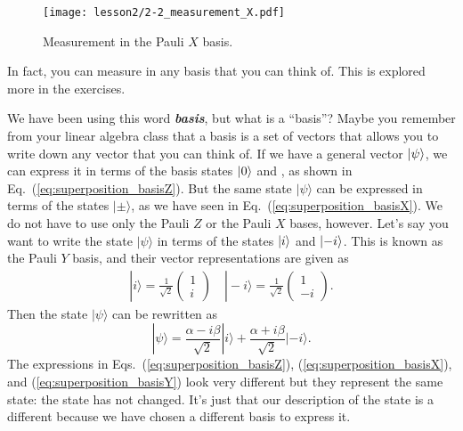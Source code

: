 \begin{figure}[H]
    \centering
    \texttt{[image: lesson2/2-2\_measurement\_X.pdf]}
    \caption{Measurement in the Pauli $X$ basis.}
    \label{fig:x-meas}
\end{figure}

In fact, you can measure in any basis that you can think of.  This is explored more in the exercises.

We have been using this word \textbf{\emph{basis}}, but what is a ``basis''? Maybe you remember from your linear algebra class that a basis is a set of vectors that allows you to write down any vector that you can think of. If we have a general vector $\left| \psi \right\rangle$, we can express it in terms of the basis states $\left| 0 \right\rangle$ and , as shown in Eq.~(\ref{eq:superposition_basisZ}).
But the same state $|\psi\rangle$ can be expressed in terms of the states $|\pm\rangle$, as we have seen in Eq.~(\ref{eq:superposition_basisX}).
We do not have to use only the Pauli $Z$ or the Pauli $X$ bases, however.
Let's say you want to write the state $|\psi\rangle$ in terms of the states $\left| i \right\rangle$ and $\left| -i \right\rangle$.
This is known as the Pauli $Y$ basis, and their vector representations are given as
\begin{align}
    |i\rangle=\frac{1}{\sqrt{2}}\left(\begin{array}{l}1 \\ i\end{array}\right) \quad|-i\rangle=\frac{1}{\sqrt{2}}\left(\begin{array}{c}1 \\ -i\end{array}\right).
    \label{eq:Pauli_Y_basis}
\end{align}
Then the state $|\psi\rangle$ can be rewritten as
\begin{equation}
    |\psi\rangle=\frac{\alpha-i \beta}{\sqrt{2}}|i\rangle+\frac{\alpha+i \beta}{\sqrt{2}}|-i\rangle.
    \label{eq:superposition_basisY}
\end{equation}
The expressions in Eqs.~(\ref{eq:superposition_basisZ}), (\ref{eq:superposition_basisX}), and (\ref{eq:superposition_basisY}) look very different but they represent the same state: the state has not changed.
It's just that our description of the state is a different because we have chosen a different basis to express it.

